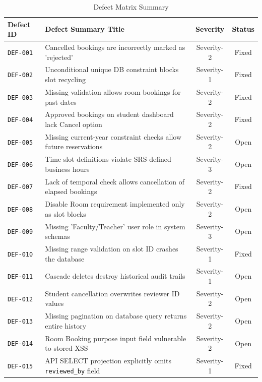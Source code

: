 \documentclass[11pt,a4paper]{article}
\begin{document}
\begin{table}[h]
\centering
\caption{Defect Matrix Summary}
\vspace{0.2cm}
\begin{tabularx}{\textwidth}{lp{8cm}cc}
\toprule
\textbf{Defect ID} & \textbf{Defect Summary Title} & \textbf{Severity} & \textbf{Status} \\ \midrule
\texttt{DEF-001} & Cancelled bookings are incorrectly marked as 'rejected' & Severity-2 & Fixed \\
\texttt{DEF-002} & Unconditional unique DB constraint blocks slot recycling & Severity-1 & Fixed \\
\texttt{DEF-003} & Missing validation allows room bookings for past dates & Severity-2 & Fixed \\
\texttt{DEF-004} & Approved bookings on student dashboard lack Cancel option & Severity-2 & Fixed \\
\texttt{DEF-005} & Missing current-year constraint checks allow future reservations & Severity-2 & Open \\
\texttt{DEF-006} & Time slot definitions violate SRS-defined business hours & Severity-3 & Open \\
\texttt{DEF-007} & Lack of temporal check allows cancellation of elapsed bookings & Severity-2 & Fixed \\
\texttt{DEF-008} & Disable Room requirement implemented only as slot blocks & Severity-2 & Open \\
\texttt{DEF-009} & Missing 'Faculty/Teacher' user role in system schemas & Severity-3 & Open \\
\texttt{DEF-010} & Missing range validation on slot ID crashes the database & Severity-1 & Fixed \\
\texttt{DEF-011} & Cascade deletes destroy historical audit trails & Severity-1 & Open \\
\texttt{DEF-012} & Student cancellation overwrites reviewer ID values & Severity-2 & Open \\
\texttt{DEF-013} & Missing pagination on database query returns entire history & Severity-2 & Open \\
\texttt{DEF-014} & Room Booking purpose input field vulnerable to stored XSS & Severity-2 & Open \\
\texttt{DEF-015} & API SELECT projection explicitly omits \texttt{reviewed\_by} field & Severity-1 & Fixed \\
\bottomrule
\end{tabularx}
\end{table}
\end{document}
